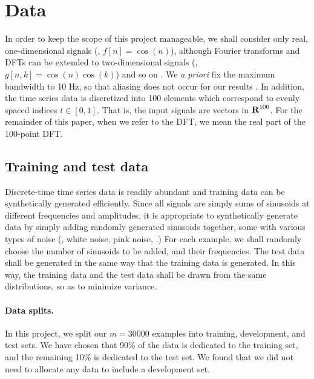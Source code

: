 \documentclass[12pt]{article}
\begin{document}

\section{Data}

In order to keep the scope of this project manageable, we shall consider only real, one-dimensional 
signals (\eg, $f[n] = \cos(n)$), although Fourier transforms and DFTs can be extended to two-dimensional signals 
(\eg, $g[n,k] = \cos(n)\cos(k)$) and so on \cite{O:17}. 
We \emph{a priori} fix the maximum bandwidth to 10 Hz, so that aliasing does not occur for our results \cite{OS:99}. 
In addition, the time series data is discretized into 100 elements which correspond to evenly spaced indices 
$t \in [0,1]$. That is, the input signals are vectors in ${\mbox{\bf R}}^{100}$. For the remainder of this paper, when we 
refer to the DFT, we mean the real part of the 100-point DFT. 


\subsection{Training and test data} Discrete-time time series data is readily abundant and 
training data can be synthetically generated efficiently. Since all signals are simply sums of 
sinusoids at different frequencies and amplitudes, it is appropriate to synthetically generate
data by simply adding randomly generated sinusoids together, some with various types of noise 
(\eg, white noise, pink noise, \etc.) For each example, we shall randomly choose the number of 
sinusoids to be added, and their frequencies. The test data shall be generated in the same way that the 
training data is generated. In this way, the training data and the test data shall be drawn from the same 
distributions, so as to minimize variance.

\paragraph{Data splits.} In this project, we split our $m=30000$ examples into training, development, and test
sets. We have chosen that 90\% of the data is dedicated to the training set, and the remaining 10\% is 
dedicated to the test set. We found that we did not need to allocate any data to include a development set.
\end{document}
